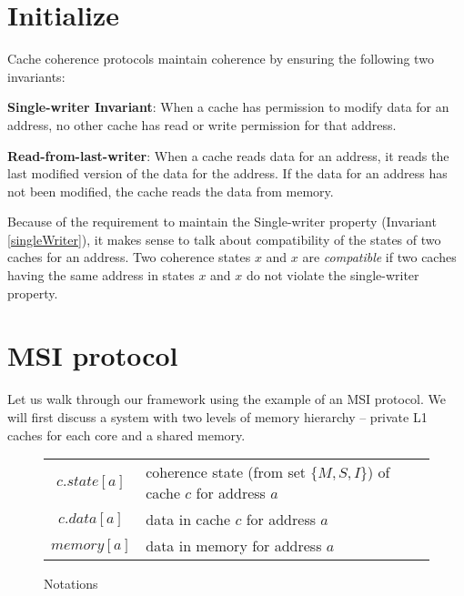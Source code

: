 \section{Initialize}
\label{sec:init}

Cache coherence protocols maintain coherence by ensuring the following two
invariants:

\begin{inv}
\textbf{Single-writer Invariant}: When a cache has permission to modify data for
an address, no other cache has read or write permission for that
address.
\label{singleWriter}
\end{inv}

\begin{inv}
\textbf{Read-from-last-writer}: When a cache reads data for an address, it reads
the last modified version of the data for the address. If the data for an
address has not been modified, the cache reads the data from memory.
\label{lastRead}
\end{inv}

Because of the requirement to maintain the Single-writer property (Invariant
\ref{singleWriter}), it makes sense to talk about compatibility of the states of
two caches for an address. Two coherence states $x$ and $x$ are \emph{compatible}
if two caches having the same address in states $x$ and $x$ do not violate the
single-writer property.

\section{MSI protocol}
\label{sec:msi}

\newcommand{\printall}[5]{\text{$#1 \langle #2 \rightarrow #3, #4, #5 \rangle$}}
\newcommand{\Req}[4]{\printall{Req}{#1}{#2}{#3}{#4}}
\newcommand{\Resp}[4]{\printall{Resp}{#1}{#2}{#3}{#4}}
\newcommand{\Data}[5]{\printall{Data}{#1}{#2}{#3}{#4}{#5}}

\newcommand{\lett}{\textbf{let}}
\newcommand{\send}{\textbf{send}}
\newcommand{\receive}{\textbf{receive}}
\newcommand{\remove}{\textbf{remove}}
\newcommand{\assert}{\textbf{assert}}
\newcommand{\call}{\textbf{call}}

Let us walk through our framework using the example of an MSI protocol. We will
first discuss a system with two levels of memory hierarchy -- private L1 caches
for each core and a shared memory. 

\begin{figure}
\begin{tabularx}{\linewidth}{|cX|}
\hline
$c.state[a]$ & coherence state (from set $\{M, S, I\}$) of cache $c$ for address $a$\\
$c.data[a]$ & data in cache $c$ for address $a$\\
$memory[a]$ & data in memory for address $a$\\
\hline
\end{tabularx}
\caption{Notations}
\label{table:lineinfo}
\end{figure}

